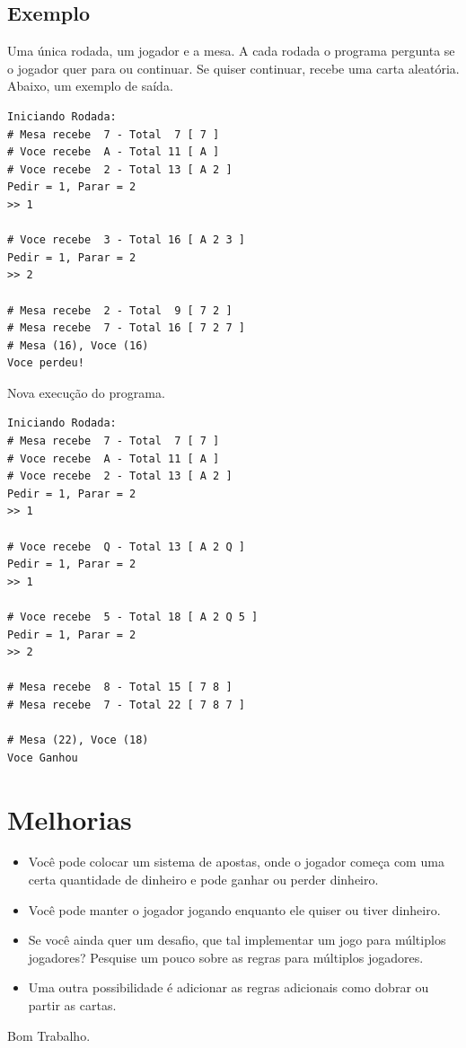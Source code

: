 \documentclass[12pt]{article}
\begin{document}
\subsection{Exemplo}

Uma única rodada, um jogador e a mesa. A cada rodada o programa pergunta se o jogador quer para ou continuar. Se quiser continuar, recebe uma carta aleatória. Abaixo, um exemplo de saída.

\begin{verbatim}
Iniciando Rodada:
# Mesa recebe  7 - Total  7 [ 7 ]
# Voce recebe  A - Total 11 [ A ]
# Voce recebe  2 - Total 13 [ A 2 ]
Pedir = 1, Parar = 2 
>> 1

# Voce recebe  3 - Total 16 [ A 2 3 ]
Pedir = 1, Parar = 2 
>> 2

# Mesa recebe  2 - Total  9 [ 7 2 ]
# Mesa recebe  7 - Total 16 [ 7 2 7 ]
# Mesa (16), Voce (16)
Voce perdeu!
\end{verbatim}

Nova execução do programa.

\begin{verbatim}
Iniciando Rodada:
# Mesa recebe  7 - Total  7 [ 7 ]
# Voce recebe  A - Total 11 [ A ]
# Voce recebe  2 - Total 13 [ A 2 ]
Pedir = 1, Parar = 2 
>> 1

# Voce recebe  Q - Total 13 [ A 2 Q ]
Pedir = 1, Parar = 2 
>> 1

# Voce recebe  5 - Total 18 [ A 2 Q 5 ]
Pedir = 1, Parar = 2 
>> 2

# Mesa recebe  8 - Total 15 [ 7 8 ]
# Mesa recebe  7 - Total 22 [ 7 8 7 ]

# Mesa (22), Voce (18)
Voce Ganhou
\end{verbatim}

\section{Melhorias}
\begin{itemize}

\item Você pode colocar um sistema de apostas, onde o jogador começa com uma certa quantidade de dinheiro e pode ganhar ou perder dinheiro.

\item Você pode manter o jogador jogando enquanto ele quiser ou tiver dinheiro.

\item Se você ainda quer um desafio, que tal implementar
um jogo para múltiplos jogadores? Pesquise um pouco sobre as regras para múltiplos jogadores.

\item Uma outra possibilidade é adicionar as regras
adicionais como dobrar ou partir as cartas.


\end{itemize}

Bom Trabalho.
\end{document}
